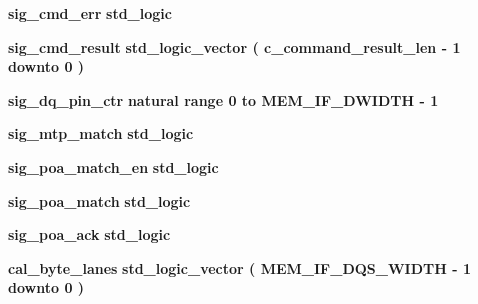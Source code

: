\begin{DoxyCompactItemize}
\item 
{\bf sig\+\_\+cmd\+\_\+err} {\bfseries \textcolor{comment}{std\+\_\+logic}\textcolor{vhdlchar}{ }} 
\item 
{\bf sig\+\_\+cmd\+\_\+result} {\bfseries \textcolor{comment}{std\+\_\+logic\+\_\+vector}\textcolor{vhdlchar}{ }\textcolor{vhdlchar}{(}\textcolor{vhdlchar}{ }\textcolor{vhdlchar}{ }\textcolor{vhdlchar}{ }\textcolor{vhdlchar}{ }{\bfseries {\bf c\+\_\+command\+\_\+result\+\_\+len}} \textcolor{vhdlchar}{-\/}\textcolor{vhdlchar}{ } \textcolor{vhdldigit}{1} \textcolor{vhdlchar}{ }\textcolor{keywordflow}{downto}\textcolor{vhdlchar}{ }\textcolor{vhdlchar}{ } \textcolor{vhdldigit}{0} \textcolor{vhdlchar}{ }\textcolor{vhdlchar}{)}\textcolor{vhdlchar}{ }} 
\item 
{\bf sig\+\_\+dq\+\_\+pin\+\_\+ctr} {\bfseries \textcolor{comment}{natural}\textcolor{vhdlchar}{ }\textcolor{vhdlchar}{ }\textcolor{vhdlchar}{ }\textcolor{keywordflow}{range}\textcolor{vhdlchar}{ }\textcolor{vhdlchar}{ } \textcolor{vhdldigit}{0} \textcolor{vhdlchar}{ }\textcolor{keywordflow}{to}\textcolor{vhdlchar}{ }\textcolor{vhdlchar}{ }\textcolor{vhdlchar}{ }\textcolor{vhdlchar}{ }{\bfseries {\bf M\+E\+M\+\_\+\+I\+F\+\_\+\+D\+W\+I\+D\+TH}} \textcolor{vhdlchar}{-\/}\textcolor{vhdlchar}{ } \textcolor{vhdldigit}{1} \textcolor{vhdlchar}{ }} 
\item 
{\bf sig\+\_\+mtp\+\_\+match} {\bfseries \textcolor{comment}{std\+\_\+logic}\textcolor{vhdlchar}{ }} 
\item 
{\bf sig\+\_\+poa\+\_\+match\+\_\+en} {\bfseries \textcolor{comment}{std\+\_\+logic}\textcolor{vhdlchar}{ }} 
\item 
{\bf sig\+\_\+poa\+\_\+match} {\bfseries \textcolor{comment}{std\+\_\+logic}\textcolor{vhdlchar}{ }} 
\item 
{\bf sig\+\_\+poa\+\_\+ack} {\bfseries \textcolor{comment}{std\+\_\+logic}\textcolor{vhdlchar}{ }} 
\item 
{\bf cal\+\_\+byte\+\_\+lanes} {\bfseries \textcolor{comment}{std\+\_\+logic\+\_\+vector}\textcolor{vhdlchar}{ }\textcolor{vhdlchar}{(}\textcolor{vhdlchar}{ }\textcolor{vhdlchar}{ }\textcolor{vhdlchar}{ }\textcolor{vhdlchar}{ }{\bfseries {\bf M\+E\+M\+\_\+\+I\+F\+\_\+\+D\+Q\+S\+\_\+\+W\+I\+D\+TH}} \textcolor{vhdlchar}{-\/}\textcolor{vhdlchar}{ } \textcolor{vhdldigit}{1} \textcolor{vhdlchar}{ }\textcolor{keywordflow}{downto}\textcolor{vhdlchar}{ }\textcolor{vhdlchar}{ } \textcolor{vhdldigit}{0} \textcolor{vhdlchar}{ }\textcolor{vhdlchar}{)}\textcolor{vhdlchar}{ }} 
\item 

\end{DoxyCompactItemize}
